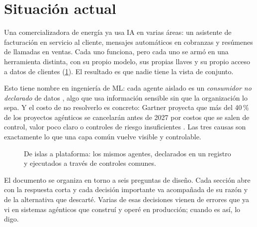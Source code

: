 \section{Situación actual}
\label{sec:intro}

Una comercializadora de energía ya usa IA en varias áreas: un asistente de facturación en servicio al cliente, mensajes
automáticos en cobranzas y resúmenes de llamadas en ventas. Cada uno funciona, pero cada uno
se armó en una herramienta distinta, con su propio modelo, sus propias llaves y su propio
acceso a datos de clientes (\cref{fig:islas}). El resultado es que nadie tiene la vista de
conjunto.

Esto tiene nombre en ingeniería de ML: cada agente aislado es un \emph{consumidor no
declarado} de datos \citep{sculley2015hidden}, algo que usa información sensible sin que la
organización lo sepa. Y el costo de no resolverlo es concreto: Gartner proyecta que más del
40\,\% de los proyectos agénticos se cancelarán antes de 2027 por costos que se salen de
control, valor poco claro o controles de riesgo insuficientes \citep{gartner2025agentic}. Las
tres causas son exactamente lo que una capa común vuelve visible y controlable.

\begin{figure}[!htbp]
  \centering
  
  \caption{De islas a plataforma: los mismos agentes, declarados en un registro y ejecutados a
  través de controles comunes.}
  \label{fig:islas}
\end{figure}

El documento se organiza en torno a seis preguntas de diseño. Cada sección abre con la respuesta corta y
cada decisión importante va acompañada de su razón y de la alternativa que descarté. Varias
de esas decisiones vienen de errores que ya vi en sistemas agénticos que construí y operé en
producción; cuando es así, lo digo.
